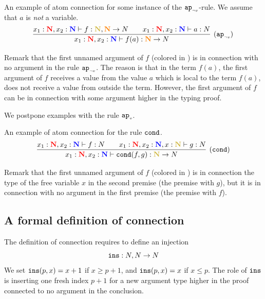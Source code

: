 \documentclass{article}
\begin{document}
\begin{Eg}\label{eg:1}\rm
An example of  atom connection for some instance of the ${{\tt ap}_{\mbox{\tiny $\neg v$}}}$-rule.
We assume that $a$ is \emph{not} a variable.
\[
\infer[(\apnotvar)]
{  {x_1} : \bfColor{red}{\N},{x_2} : \bfColor{blue}{\N}
					\prove f(a) : \bfColor{orange}{\N} \rightarrow \N}
    {
	  {   {x_1} : \bfColor{red}{\N},{x_2} : \bfColor{blue}{\N}
					\prove f : \bfColor{oldgold}{\N}, \bfColor{orange}{\N} \rightarrow \N}
      {\ \ \ \ \ \ }
      {   {x_1} : \bfColor{red}{\N}, x_2: \bfColor{blue}{\N}
					\prove a : \N}
	}
\]
\end{Eg}
Remark that the first unnamed argument of $f$ (colored in ) 
is in connection with no argument in the rule ${{\tt ap}_{\mbox{\tiny $\neg v$}}}$.
The reason is that in the term $f(a)$,
the first argument of $f$ receives a value from the value $a$ which is local to the term $f(a)$,
does not receive a value from outside the term.
However, the first argument of $f$ can be in connection with some argument higher in the typing proof. 

We postpone examples with the rule ${{\tt ap}_{\mbox{\tiny $v$}}}$.

\begin{Eg}\label{eg:2}\rm
An example of  atom connection for the rule ${\tt cond}$.
\[
\infer[(\cond)]
{  {x_1} : \bfColor{red}{\N},{x_2} : \bfColor{blue}{\N}
					\prove \cond(f,g) : \bfColor{oldgold}{\N} \rightarrow \N}
    {
      {   {x_1} : \bfColor{red}{\N},{x_2} : \bfColor{blue}{\N}
					\prove f : \N}
           {\ \ \ \ \ \ }
	  {   {x_1} : \bfColor{red}{\N},{x_2} : \bfColor{blue}{\N}, x  : \bfColor{oldgold}{\N} 
					\prove g : \N}
    }
\]
\end{Eg}
Remark that the first unnamed argument of $f$ (colored in ) 
is in connection the type of the free variable $x$ in the second premise (the premise with $g$),
but it is in connection with no argument in the first premise (the premise with $f$).


\subsection{A formal definition of connection}
The definition of connection requires to define an injection 
$$
{\tt ins}:{N},{N} \rightarrow{N}
$$
We set ${\tt ins}(p,x)=x+1$ if $x \ge p+1$, and ${\tt ins}(p,x)=x$ if $x\le p$.
The role of ${\tt ins}$ is inserting one fresh index $p+1$ for a new argument type higher in the proof
connected to no argument in the conclusion.
\end{document}
